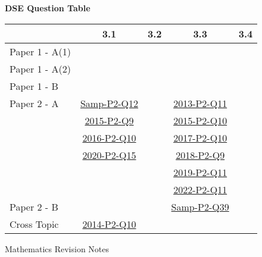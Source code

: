 \documentclass[12pt, a4paper]{article}
\begin{document}
\begin{absolutelynopagebreak}
\begin{center}
\textbf{DSE Question Table}
\end{center}
\begin{center}
\begin{tabular}{|l|c|c|c|c|}
\hline
        & 3.1 & 3.2 & 3.3 & 3.4 \\\hline
\hline
Paper 1 - A(1)&  &  &  &  \\
\hline
Paper 1 - A(2)&  &  &  &  \\
\hline
Paper 1 - B&  &  &  &  \\
\hline
\hline
Paper 2 - A& \hyperref[DSE2012S-CoreP2-Q12]{Samp-P2-Q12} &  & \hyperref[DSE2013-CoreP2-Q11]{2013-P2-Q11} &  \\
& \hyperref[DSE2015-CoreP2-Q09]{2015-P2-Q9} &  & \hyperref[DSE2015-CoreP2-Q10]{2015-P2-Q10} &  \\
& \hyperref[DSE2016-CoreP2-Q10]{2016-P2-Q10} &  & \hyperref[DSE2017-CoreP2-Q10]{2017-P2-Q10} &  \\
& \hyperref[DSE2020-CoreP2-Q15]{2020-P2-Q15} &  & \hyperref[DSE2018-CoreP2-Q09]{2018-P2-Q9} &  \\
&  &  & \hyperref[DSE2019-CoreP2-Q11]{2019-P2-Q11} &  \\
&  &  & \hyperref[DSE2022-CoreP2-Q11]{2022-P2-Q11} &  \\
\hline
Paper 2 - B&  &  & \hyperref[DSE2012S-CoreP2-Q39]{Samp-P2-Q39} &  \\
\hline
\hline
Cross Topic& \hyperref[DSE2014-CoreP2-Q10]{2014-P2-Q10} &  &  &  \\
\hline
\end{tabular}
\end{center}
\end{absolutelynopagebreak}
\newpage
\newpage
\thispagestyle{empty}
\begin{center}
Mathematics Revision Notes\\\vspace{1cm}
\\\vspace{1cm}
{\fontsize{24pt}{24pt}\selectfont {Special Lines and Centres in a Triangle}} \\\vspace{1cm}
\label{chapter:S3-4}

\end{center}
\vspace{0.5cm}
\hline
\end{document}
